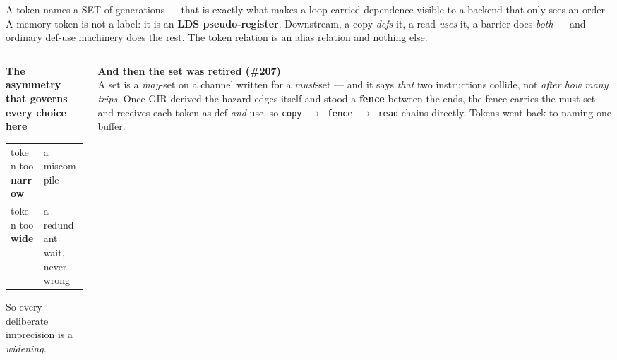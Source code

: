 \documentclass[aspectratio=169,9pt]{beamer}
\newcommand{\key}[1]{\textcolor{acc}{\textbf{#1}}}
\newcommand{\bad}[1]{\textcolor{warn}{\textbf{#1}}}
\newcommand{\good}[1]{\textcolor{ok}{\textbf{#1}}}
\begin{document}
\begin{frame}{A token names a SET of generations --- that is exactly what makes a loop-carried dependence visible to a backend that only sees an order}
\footnotesize
A memory token is not a label: it is an \key{LDS pseudo-register}. Downstream, a copy \emph{defs} it, a read
\emph{uses} it, a barrier does \emph{both} --- and ordinary def-use machinery does the rest. The token relation is
an alias relation and nothing else.

\begin{center}
\end{center}

\begin{columns}[T]
\begin{column}{0.5\textwidth}
\textbf{The asymmetry that governs every choice here}
\begin{center}\scriptsize
\begin{tabular}{@{}ll@{}}
\toprule
token too \bad{narrow} & a miscompile \\
token too \good{wide} & a redundant wait, never wrong \\
\bottomrule
\end{tabular}
\end{center}
So every deliberate imprecision is a \emph{widening}.
\end{column}
\begin{column}{0.5\textwidth}
\textbf{And then the set was retired (\#207)}\\[2pt]
A set is a \emph{may}-set on a channel written for a \emph{must}-set --- and it says \emph{that} two
instructions collide, not \emph{after how many trips}. Once GIR derived the hazard edges itself and stood a
\key{fence} between the ends, the fence carries the must-set and receives each token as def \emph{and} use, so
\texttt{copy $\to$ fence $\to$ read} chains directly. Tokens went back to naming one buffer.
\end{column}
\end{columns}
\end{frame}
\end{document}
